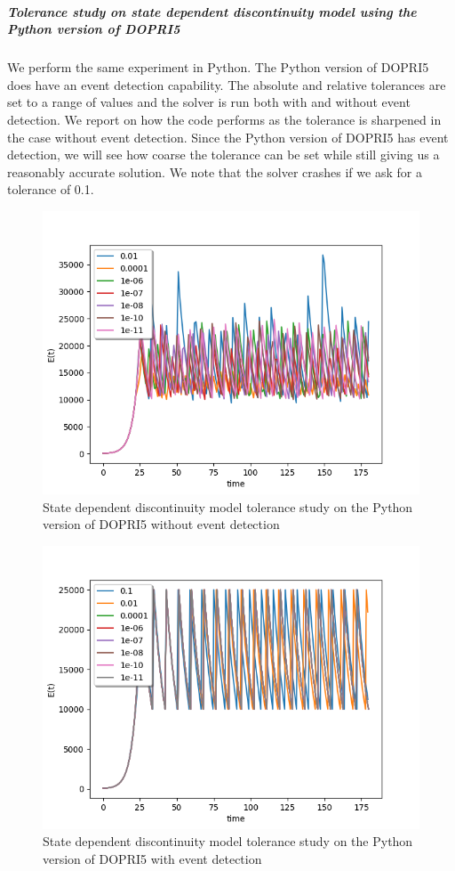 \subparagraph{Tolerance study on state dependent discontinuity model using the Python version of DOPRI5}
We perform the same experiment in Python. The Python version of DOPRI5 does have an event detection capability. The absolute and relative tolerances are set to a range of values and the solver is run both with and without event detection. We report on how the code performs as the tolerance is sharpened in the case without event detection. Since the Python version of DOPRI5 has event detection, we will see how coarse the tolerance can be set while still giving us a reasonably accurate solution. We note that the solver crashes if we ask for a tolerance of 0.1.

\begin{figure}[h]
\centering
\includegraphics[width=0.7\linewidth]{./figures/tolerance_state_rk45_no_event_py}
\caption{State dependent discontinuity model tolerance study on the Python version of DOPRI5 without event detection}
\label{fig:tolerance_state_rk45_no_event_py}
\end{figure}

\begin{figure}[h]
\centering
\includegraphics[width=0.7\linewidth]{./figures/tolerance_state_rk45_with_event_py}
\caption{State dependent discontinuity model tolerance study on the Python version of DOPRI5 with event detection}
\label{fig:tolerance_state_rk45_with_event_py}
\end{figure}

